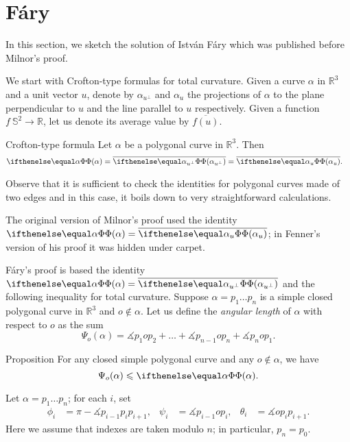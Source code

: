 \section{F\'ary}\label{sec:fary}

In this section, we sketch the solution of Istv\'an F\'ary \cite{fary} which was published before Milnor's proof.

We start with Crofton-type formulas for total curvature.
Given a curve $\alpha$ in $\mathbb{R}^3$ and a unit vector $u$, denote by $\alpha_{u^\perp}$ 
and $\alpha_u$ the projections of $\alpha$ to the plane perpendicular to $u$ and the line parallel to $u$ respectively.
Given a function $f\:\mathbb{S}^2\to\mathbb{R}$, let us denote its average value by $\overline{f(u)}$.

\begin{thm}{Crofton-type formula}\label{prop:tc-crofton}
Let $\alpha$ be a polygonal curve in $\mathbb{R}^3$.
Then
\begin{align*}
\tc\alpha
&=\overline{\tc{\alpha_{u^\perp}}}
=\overline{\tc{\alpha_u}}.
\end{align*}
\end{thm}


Observe that it is sufficient to check the identities for polygonal curves made of two edges
and in this case, it boils down to very straightforward calculations.
\qeds

The original version of Milnor's proof 
used the identity $\tc\alpha=\overline{\tc{\alpha_u}}$;
in Fenner's version of his proof it was hidden under carpet.

F\'ary's proof is based the identity $\tc\alpha=\overline{\tc{\alpha_{u^\perp}}}$ and the following inequality for total curvature.
Suppose $\alpha=p_1\dots p_n$ is a simple closed polygonal curve in $\mathbb{R}^3$ and $o\notin\alpha$.
Let us define the \emph{angular length} of $\alpha$ with respect to $o$ as the sum
\[\Psi_o(\alpha)=\measuredangle p_{1} o p_{2}+\dots+\measuredangle p_{n-1} o p_{n}+\measuredangle p_{n} o p_{1}.\]

\begin{thm}{Proposition}\label{prop:angular-length}
For any closed simple polygonal curve and any $o\notin\alpha$, we have 
\[\Psi_o(\alpha)\le \tc{\alpha}.\]
\end{thm}

Let $\alpha=p_1\dots p_n$; for each $i$, set 
\begin{align*}
\phi_i&=\pi-\measuredangle p_{i-1}p_ip_{i+1},
&
\psi_i&=\measuredangle p_{i-1} o p_{i},
&
\theta_i&=\measuredangle o p_i p_{i+1}.
\end{align*}
Here we assume that indexes are taken modulo $n$; in particular, $p_{n}=p_0$.

